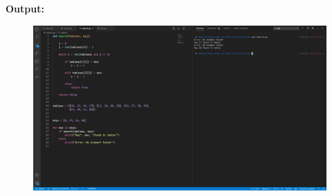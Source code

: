 \documentclass{article}
\begin{document}
\textbf{Output:}
\begin{figure}[H]
    \centering
    \includegraphics[width=1\textwidth]{Fig3}
\end{figure}
\end{document}
